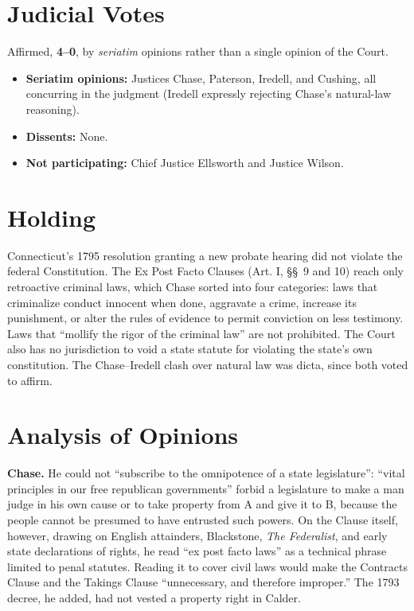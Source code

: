 \documentclass[12pt]{article}
\begin{document}
\section{Judicial Votes}

Affirmed, \textbf{4--0}, by \textit{seriatim} opinions rather than a single opinion of the Court.
\begin{itemize}
\item \textbf{Seriatim opinions:} Justices Chase, Paterson, Iredell, and Cushing, all concurring in the judgment (Iredell expressly rejecting Chase's natural-law reasoning).
\item \textbf{Dissents:} None.
\item \textbf{Not participating:} Chief Justice Ellsworth and Justice Wilson.
\end{itemize}

\section{Holding}

Connecticut's 1795 resolution granting a new probate hearing did not violate the federal Constitution. The Ex Post Facto Clauses (Art. I, \S\S~9 and 10) reach only retroactive criminal laws, which Chase sorted into four categories: laws that criminalize conduct innocent when done, aggravate a crime, increase its punishment, or alter the rules of evidence to permit conviction on less testimony. Laws that ``mollify the rigor of the criminal law'' are not prohibited. The Court also has no jurisdiction to void a state statute for violating the state's own constitution. The Chase--Iredell clash over natural law was dicta, since both voted to affirm.

\section{Analysis of Opinions}

\textbf{Chase.} He could not ``subscribe to the omnipotence of a state legislature'': ``vital principles in our free republican governments'' forbid a legislature to make a man judge in his own cause or to take property from A and give it to B, because the people cannot be presumed to have entrusted such powers. On the Clause itself, however, drawing on English attainders, Blackstone, \textit{The Federalist}, and early state declarations of rights, he read ``ex post facto laws'' as a technical phrase limited to penal statutes. Reading it to cover civil laws would make the Contracts Clause and the Takings Clause ``unnecessary, and therefore improper.'' The 1793 decree, he added, had not vested a property right in Calder.
\end{document}

